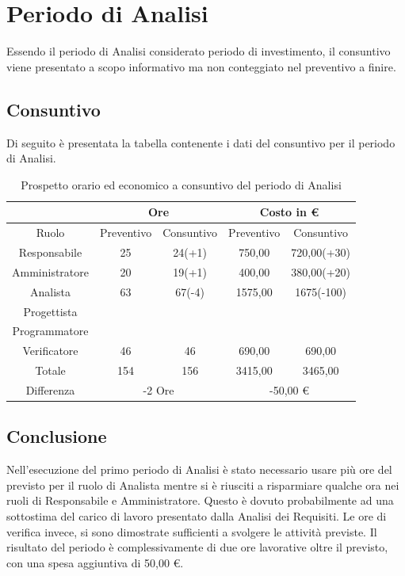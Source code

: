 \documentclass[./PianodiProgetto.tex]{subfiles}
\begin{document}
\section{Periodo di Analisi}
Essendo il periodo di Analisi considerato periodo di investimento, il consuntivo viene presentato a scopo informativo ma non conteggiato nel preventivo a finire.
\subsection{Consuntivo}
Di seguito è presentata la tabella contenente i dati del consuntivo per il
periodo di Analisi.

\begin{table}[H]
	\centering
	\begin{tabular}{|c|c|c|c|c|}
		\hline
	 	 & \multicolumn{2}{c|}{Ore} & \multicolumn{2}{c|}{Costo in \euro{}}  \\ \hline
		Ruolo&Preventivo&Consuntivo&Preventivo&Consuntivo \\ \hline
		Responsabile&25&24(+1)&750,00&720,00(+30)  \\ \hline
		Amministratore&20&19(+1)&400,00&380,00(+20)  \\ \hline
		Analista&63&67(-4)&1575,00&1675(-100)  \\ \hline
		Progettista& & & &  \\ \hline
		Programmatore& & & &  \\ \hline
		Verificatore&46&46&690,00&690,00  \\ \hline
		Totale&154&156&3415,00&3465,00  \\ \hline
		Differenza& \multicolumn{2}{c|}{-2 Ore} & \multicolumn{2}{c|}{-50,00 \euro{}} \\ \hline
	\end{tabular}
	\caption{Prospetto orario ed economico a consuntivo del periodo di Analisi}
\end{table}

\subsection{Conclusione}
Nell'esecuzione del primo periodo di Analisi è stato necessario usare più
ore del previsto per il ruolo di Analista mentre si è riusciti a risparmiare
qualche ora nei ruoli di Responsabile e Amministratore. Questo è dovuto
probabilmente ad una sottostima del carico di lavoro presentato dalla Analisi
dei Requisiti. Le ore di verifica invece, si sono dimostrate sufficienti a svolgere
le attività previste. Il risultato del periodo è complessivamente di due ore
lavorative oltre il previsto, con una spesa aggiuntiva di 50,00 \euro{}.
\end{document}

